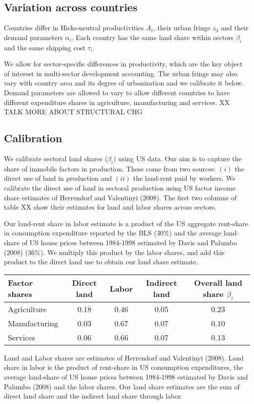 \documentclass[12pt]{article}
\begin{document}
\subsection{Variation across countries}
Countries differ in Hicks-neutral productivities $A_i$, their urban fringe $z_3$ and their demand parameters $\alpha_i$. Each country has the same land share within sectors $\beta_i$ and the same shipping cost $\tau_i$.

We allow for sector-specific differences in productivity, which are the key object of interest in multi-sector development accounting. The urban fringe may also vary with country area and its degree of urbanization and we calibrate it below. Demand parameters are allowed to vary to allow different countries to have different expenditure shares in agriculture, manufacturing and services. XX TALK MORE ABOUT STRUCTURAL CHG

\subsection{Calibration}

We calibrate sectoral land shares ($\beta_i$) using US data. Our aim is to capture the share of immobile factors in production. These come from two sources: $(i)$ the direct use of land in production and $(ii)$ the land-rent paid by workers. We calibrate the direct use of land in sectoral production using US factor income share estimates of Herrendorf and Valentinyi (2008). The first two columns of table XX show their estimates for land and labor shares across sectors.

Our land-rent share in labor estimate is a product of the US aggregate rent-share in consumption expenditure reported by the BLS ($30\%$) and the average land-share of US house prices between 1984-1998 estimated by Davis and Palumbo (2008) (36\%). We multiply this product by the labor shares, and add this product to the direct land use to obtain our land share estimate.

\begin{table}[h!] \center
\begin{tabular}{l|ccc|c}
\hline 
Factor shares & Direct land & Labor & Indirect land & Overall land share $\beta_i$ \\ \hline
Agriculture & 0.18 & 0.46  & 0.05 & 0.23 \\
Manufacturing& 0.03 & 0.67 & 0.07 & 0.10  \\
Services    &  0.06 & 0.66 & 0.07 & 0.13 \\ \hline 
\end{tabular}

\noindent \footnotesize{Land and Labor shares are estimates of Herrendorf and Valentinyi (2008). Land share in labor is the product of rent-share in US consumption expenditures, the average land-share of US house prices between 1984-1998 estimated by Davis and Palumbo (2008) and the labor shares. Our land share estimates are the sum of direct land share and the indirect land share through labor.}
\end{table}
\end{document}
